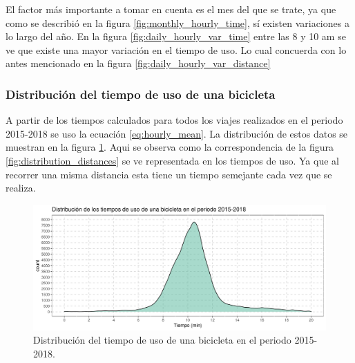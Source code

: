 El factor más importante a tomar en cuenta es el mes del que se trate, ya que como se describió en la figura \ref{fig:monthly_hourly_time}, sí existen variaciones a lo largo del año. En la figura \ref{fig:daily_hourly_var_time} entre las 8 y 10 am se ve que existe una mayor variación en el tiempo de uso. Lo cual concuerda con lo antes mencionado en la figura \ref{fig:daily_hourly_var_distance}

\subsubsection{Distribución del tiempo de uso de una bicicleta}

A partir de los tiempos calculados para todos los viajes realizados en el periodo 2015-2018 se uso la ecuación \ref{eq:hourly_mean}. La distribución de estos datos se muestran en la figura \ref{fig:distribution_times}. Aqui se observa como la correspondencia de la figura \ref{fig:distribution_distances} se ve representada en los tiempos de uso. Ya que al recorrer una misma distancia esta tiene un tiempo semejante cada vez que se realiza.

\begin{figure}[H]
    \centering
    \includegraphics[width=16cm]{Graphics/distribution_time_travel.png}
    \caption{Distribución del tiempo de uso de una bicicleta en el periodo 2015-2018.}
    \label{fig:distribution_times}
\end{figure}